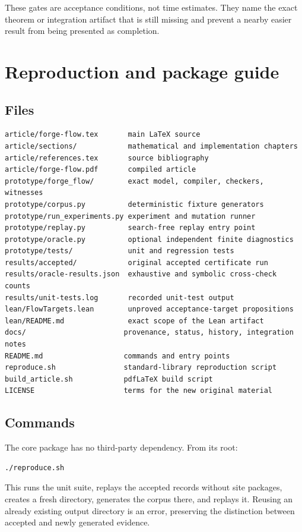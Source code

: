 These gates are acceptance conditions, not time estimates. They name the exact theorem or integration artifact that is still missing and prevent a nearby easier result from being presented as completion.

\section{Reproduction and package guide}
\label{sec:reproduce}

\subsection{Files}

\par\noindent\begin{minipage}{\textwidth}
\begin{lstlisting}
article/forge-flow.tex       main LaTeX source
article/sections/            mathematical and implementation chapters
article/references.tex       source bibliography
article/forge-flow.pdf       compiled article
prototype/forge_flow/        exact model, compiler, checkers, witnesses
prototype/corpus.py          deterministic fixture generators
prototype/run_experiments.py experiment and mutation runner
prototype/replay.py          search-free replay entry point
prototype/oracle.py          optional independent finite diagnostics
prototype/tests/             unit and regression tests
results/accepted/            original accepted certificate run
results/oracle-results.json  exhaustive and symbolic cross-check counts
results/unit-tests.log       recorded unit-test output
lean/FlowTargets.lean        unproved acceptance-target propositions
lean/README.md               exact scope of the Lean artifact
docs/                       provenance, status, history, integration notes
README.md                   commands and entry points
reproduce.sh                standard-library reproduction script
build_article.sh            pdfLaTeX build script
LICENSE                     terms for the new original material
\end{lstlisting}
\end{minipage}\par

\subsection{Commands}

The core package has no third-party dependency. From its root:
\par\noindent\begin{minipage}{\textwidth}
\begin{lstlisting}
./reproduce.sh
\end{lstlisting}
\end{minipage}\par
This runs the unit suite, replays the accepted records without site packages, creates a fresh  directory, generates the corpus there, and replays it. Reusing an already existing output directory is an error, preserving the distinction between accepted and newly generated evidence.

